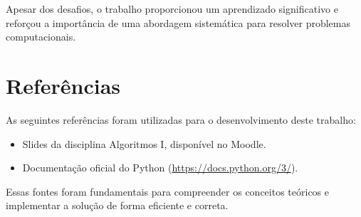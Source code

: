 \documentclass[a4paper,12pt]{article}
\begin{document}
Apesar dos desafios, o trabalho proporcionou um aprendizado significativo e reforçou a importância de uma abordagem sistemática para resolver problemas computacionais.

\section*{Referências}

As seguintes referências foram utilizadas para o desenvolvimento deste
trabalho:

\begin{itemize}
    \item Slides da disciplina Algoritmos I, disponível no Moodle.
    \item Documentação oficial do Python (\url{https://docs.python.org/3/}).
\end{itemize}

Essas fontes foram fundamentais para compreender os conceitos teóricos e
implementar a solução de forma eficiente e correta.
\end{document}
